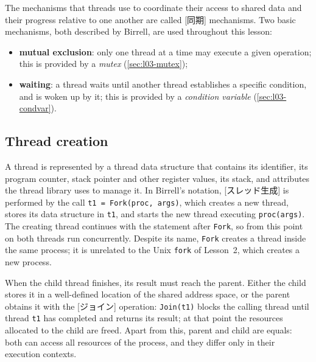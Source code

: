 \documentclass[../main.tex]{subfiles}
\begin{document}
The mechanisms that threads use to coordinate their access to shared data
and their progress relative to one another are called
[同期] mechanisms.  Two basic mechanisms, both
described by Birrell, are used throughout this lesson:
\begin{itemize}
  \item \textbf{mutual exclusion}: only one thread at a time may execute a
    given operation; this is provided by a \emph{mutex}
    (\cref{sec:l03-mutex});
  \item \textbf{waiting}: a thread waits until another thread establishes a
    specific condition, and is woken up by it; this is provided by a
    \emph{condition variable} (\cref{sec:l03-condvar}).
\end{itemize}

\subsection{Thread creation}
\label{sec:l03-creation}

A thread is represented by a thread data structure that contains its
identifier, its program counter, stack pointer and other register values,
its stack, and attributes the thread library uses to manage
it.  In Birrell's notation, [スレッド生成] is
performed by the call \texttt{t1 = Fork(proc, args)}, which creates a new
thread, stores its data structure in \texttt{t1}, and
starts the new thread executing \texttt{proc(args)}.  The creating thread
continues with the statement after \texttt{Fork}, so from this point on both
threads run concurrently.  Despite its name, \texttt{Fork} creates a
thread inside the same process; it is unrelated to the Unix \texttt{fork}
of Lesson~2, which creates a new process.

When the child thread finishes, its result must reach the parent.  Either the
child stores it in a well-defined location of the shared address space, or
the parent obtains it with the [ジョイン] operation:
\texttt{Join(t1)} blocks the calling thread until thread \texttt{t1} has
completed and returns its result; at that point the resources allocated to
the child are freed.  Apart from this, parent and child are equals: both can
access all resources of the process, and they differ only in their
execution contexts.
\end{document}

